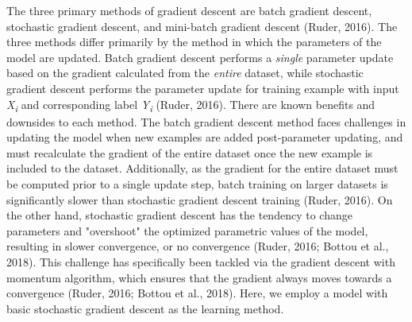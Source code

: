 \documentclass[11pt,titlepage]{article}
\begin{document}
The three primary methods of gradient descent are batch gradient descent, stochastic gradient descent, and mini-batch gradient descent (Ruder, 2016). The three methods differ primarily by the method in which the parameters of the model are updated. Batch gradient descent performs a \textit{single} parameter update based on the gradient calculated from the \textit{entire} dataset, while stochastic gradient descent performs the parameter update for training example with input \textit{X\textsubscript{i}} and corresponding label \textit{Y\textsubscript{i}} (Ruder, 2016). There are known benefits and downsides to each method. The batch gradient descent method faces challenges in updating the model when new examples are added post-parameter updating, and must recalculate the gradient of the entire dataset once the new example is included to the dataset. Additionally, as the gradient for the entire dataset must be computed prior to a single update step, batch training on larger datasets is significantly slower than stochastic gradient descent training (Ruder, 2016). On the other hand, stochastic gradient descent has the tendency to change parameters and "overshoot" the optimized parametric values of the model, resulting in slower convergence, or no convergence (Ruder, 2016; Bottou et al., 2018). This challenge has specifically been tackled via the gradient descent with momentum algorithm, which ensures that the gradient always moves towards a convergence (Ruder, 2016; Bottou et al., 2018). Here, we employ a model with basic stochastic gradient descent as the learning method.\par
\end{document}
